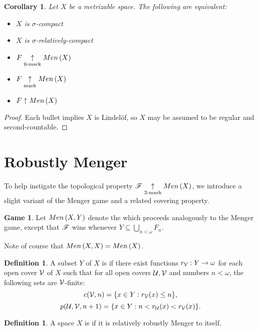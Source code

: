 \documentclass{amsart}
\newtheorem{corollary}[theorem]{Corollary}
\theoremstyle{definition}
\newtheorem{definition}[theorem]{Definition}
\newtheorem{game}[theorem]{Game}
\begin{document}
\begin{corollary}
  Let \(X\) be a metrizable space. The following are equivalent:
  \begin{itemize}
    \item \(X\) is \(\sigma\)-compact
    \item \(X\) is \(\sigma\)-relatively-compact
    \item \(F \underset{0\text{-mark}}{\uparrow} Men\left({X}\right)\)
    \item \(F \underset{\text{mark}}{\uparrow} Men\left({X}\right)\)
    \item \(F \uparrow Men\left({X}\right)\)
  \end{itemize}
\end{corollary}

\begin{proof}
  Each bullet implies \(X\) is Lindel\"of, so \(X\) may be assumed to be
  regular and second-countable.
\end{proof}



\section{Robustly Menger}

To help instigate the topological property \(\mathscr{F}\underset{2\text{-mark}}{\uparrow}Men\left({X}\right)\),
we introduce a
slight variant of the Menger game and a related covering property.

\begin{game}
  Let \(Men\left({X,Y}\right)\) denote the  which proceeds
  analogously to the Menger game, except that \(\mathscr{F}\) wins whenever
  \(Y\subseteq\bigcup_{n<\omega} F_n\).
\end{game}

Note of course that \(Men\left({X,X}\right)=Men\left({X}\right)\).

\begin{definition}
  A subset \(Y\) of \(X\) is  if there exist
  functions \(r_{\mathcal{V}}:Y\to\omega\)
  for each open cover \(\mathcal{V}\) of \(X\) such that
  for all open covers \(\mathcal{U},\mathcal{V}\) and numbers \(n<\omega\),
  the following sets are \(\mathcal{V}\)-finite:
    \[
      c(\mathcal{V},n)=\{ x\in Y : r_{\mathcal{V}}(x)\leq n\}
    ,\]
    \[
      p(\mathcal{U},\mathcal{V},n+1)=\{ x\in Y : n<r_{\mathcal{U}}(x)<r_{\mathcal{V}}(x)\}
    .\]
\end{definition}

\begin{definition}
  A space \(X\) is  if it is relatively robustly
  Menger to itself.
\end{definition}
\end{document}
